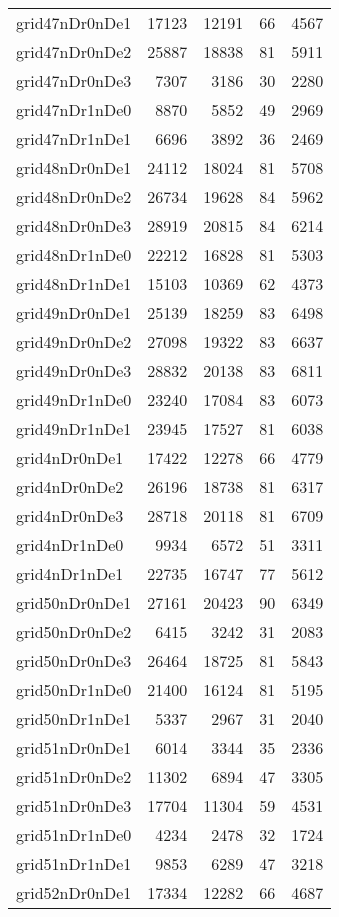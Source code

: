 \begin{tabular}{lrrrr}
grid47nDr0nDe1 & 17123 & 12191 & 66 & 4567 \\
grid47nDr0nDe2 & 25887 & 18838 & 81 & 5911 \\
grid47nDr0nDe3 & 7307 & 3186 & 30 & 2280 \\
grid47nDr1nDe0 & 8870 & 5852 & 49 & 2969 \\
grid47nDr1nDe1 & 6696 & 3892 & 36 & 2469 \\
grid48nDr0nDe1 & 24112 & 18024 & 81 & 5708 \\
grid48nDr0nDe2 & 26734 & 19628 & 84 & 5962 \\
grid48nDr0nDe3 & 28919 & 20815 & 84 & 6214 \\
grid48nDr1nDe0 & 22212 & 16828 & 81 & 5303 \\
grid48nDr1nDe1 & 15103 & 10369 & 62 & 4373 \\
grid49nDr0nDe1 & 25139 & 18259 & 83 & 6498 \\
grid49nDr0nDe2 & 27098 & 19322 & 83 & 6637 \\
grid49nDr0nDe3 & 28832 & 20138 & 83 & 6811 \\
grid49nDr1nDe0 & 23240 & 17084 & 83 & 6073 \\
grid49nDr1nDe1 & 23945 & 17527 & 81 & 6038 \\
grid4nDr0nDe1 & 17422 & 12278 & 66 & 4779 \\
grid4nDr0nDe2 & 26196 & 18738 & 81 & 6317 \\
grid4nDr0nDe3 & 28718 & 20118 & 81 & 6709 \\
grid4nDr1nDe0 & 9934 & 6572 & 51 & 3311 \\
grid4nDr1nDe1 & 22735 & 16747 & 77 & 5612 \\
grid50nDr0nDe1 & 27161 & 20423 & 90 & 6349 \\
grid50nDr0nDe2 & 6415 & 3242 & 31 & 2083 \\
grid50nDr0nDe3 & 26464 & 18725 & 81 & 5843 \\
grid50nDr1nDe0 & 21400 & 16124 & 81 & 5195 \\
grid50nDr1nDe1 & 5337 & 2967 & 31 & 2040 \\
grid51nDr0nDe1 & 6014 & 3344 & 35 & 2336 \\
grid51nDr0nDe2 & 11302 & 6894 & 47 & 3305 \\
grid51nDr0nDe3 & 17704 & 11304 & 59 & 4531 \\
grid51nDr1nDe0 & 4234 & 2478 & 32 & 1724 \\
grid51nDr1nDe1 & 9853 & 6289 & 47 & 3218 \\
grid52nDr0nDe1 & 17334 & 12282 & 66 & 4687 \\

\end{tabular}
